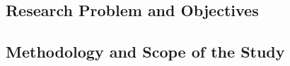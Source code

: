 







\subsection{Research Problem and Objectives}

\subsection{Methodology and Scope of the Study}

